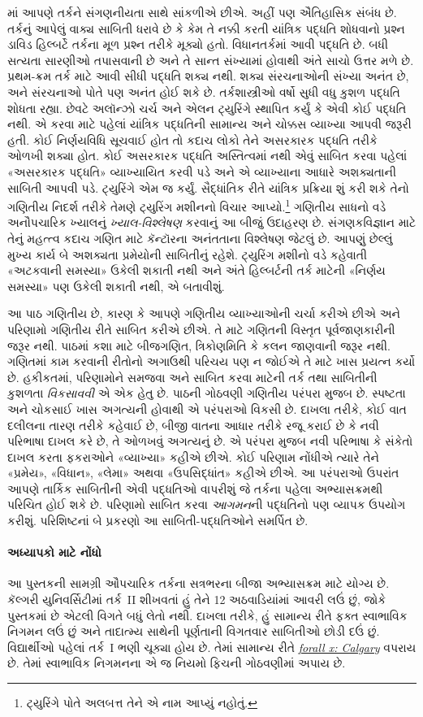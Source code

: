 માં આપણે તર્કને સંગણનીયતા સાથે સાંકળીએ છીએ. અહીં
પણ ઐતિહાસિક સંબંધ છે. તર્કનું આપેલું વાક્ય સાબિતી ધરાવે છે કે કેમ
તે નક્કી કરતી યાંત્રિક પદ્ધતિ શોધવાનો પ્રશ્ન ડાવિડ હિલ્બર્ટે તર્કના
મૂળ પ્રશ્ન તરીકે મૂક્યો હતો. વિધાનતર્કમાં આવી પદ્ધતિ છે. બધી સત્યતા
સારણીઓ તપાસવાની છે અને તે સાન્ત સંખ્યામાં હોવાથી અંતે સાચો ઉત્તર
મળે છે. પ્રથમ-ક્રમ તર્ક માટે આવી સીધી પદ્ધતિ શક્ય નથી. શક્ય
સંરચનાઓની સંખ્યા અનંત છે, અને સંરચનાઓ પોતે પણ અનંત હોઈ શકે છે.
તર્કશાસ્ત્રીઓ વર્ષો સુધી વધુ કુશળ પદ્ધતિ શોધતા રહ્યા. છેવટે અલૉન્ઝો
ચર્ચ અને એલન ટ્યુરિંગે સ્થાપિત કર્યું કે એવી કોઈ પદ્ધતિ નથી. એ કરવા
માટે પહેલાં યાંત્રિક પદ્ધતિની સામાન્ય અને ચોક્કસ વ્યાખ્યા આપવી જરૂરી
હતી. કોઈ નિર્ણયવિધિ સૂચવાઈ હોત તો કદાચ લોકો તેને અસરકારક પદ્ધતિ
તરીકે ઓળખી શક્યા હોત. કોઈ અસરકારક પદ્ધતિ અસ્તિત્વમાં નથી એવું
સાબિત કરવા પહેલાં «અસરકારક પદ્ધતિ» વ્યાખ્યાયિત કરવી પડે અને એ
વ્યાખ્યાના આધારે અશક્યતાની સાબિતી આપવી પડે. ટ્યુરિંગે એમ જ કર્યું.
સૈદ્ધાંતિક રીતે યાંત્રિક પ્રક્રિયા શું કરી શકે તેનો ગણિતીય નિદર્શ
તરીકે તેમણે ટ્યુરિંગ મશીનનો વિચાર આપ્યો.\footnote{ટ્યુરિંગે પોતે
અલબત્ત તેને એ નામ આપ્યું નહોતું.} ગણિતીય સાધનો વડે અનૌપચારિક ખ્યાલનું
\emph{ખ્યાલ-વિશ્લેષણ} કરવાનું આ બીજું ઉદાહરણ છે. સંગણકવિજ્ઞાન માટે
તેનું મહત્ત્વ કદાચ ગણિત માટે કૅન્ટૉરના અનંતતાના વિશ્લેષણ જેટલું છે.
આપણું છેલ્લું મુખ્ય કાર્ય બે અશક્યતા પ્રમેયોની સાબિતીનું રહેશે.
ટ્યુરિંગ મશીનો વડે કહેવાતી «અટકવાની સમસ્યા» ઉકેલી શકાતી નથી અને
અંતે હિલ્બર્ટની તર્ક માટેની «નિર્ણય સમસ્યા» પણ ઉકેલી શકાતી નથી, એ
બતાવીશું.

આ પાઠ ગણિતીય છે, કારણ કે આપણે ગણિતીય વ્યાખ્યાઓની ચર્ચા કરીએ છીએ અને
પરિણામો ગણિતીય રીતે સાબિત કરીએ છીએ. તે માટે ગણિતની વિસ્તૃત પૂર્વજાણકારીની
જરૂર નથી. પાઠમાં કશા માટે બીજગણિત, ત્રિકોણમિતિ કે કલન જાણવાની જરૂર
નથી. ગણિતમાં કામ કરવાની રીતોનો અગાઉથી પરિચય પણ ન જોઈએ તે માટે ખાસ
પ્રયત્ન કર્યો છે. હકીકતમાં, પરિણામોને સમજવા અને સાબિત કરવા માટેની
તર્ક તથા સાબિતીની કુશળતા \emph{વિકસાવવી} એ એક હેતુ છે. પાઠની ગોઠવણી
ગણિતીય પરંપરા મુજબ છે. સ્પષ્ટતા અને ચોકસાઈ ખાસ અગત્યની હોવાથી એ
પરંપરાઓ વિકસી છે. દાખલા તરીકે, કોઈ વાત દલીલના તારણ તરીકે કહેવાઈ
છે, બીજી વાતના આધાર તરીકે રજૂ કરાઈ છે કે નવી પરિભાષા દાખલ કરે છે,
તે ઓળખવું અગત્યનું છે. એ પરંપરા મુજબ નવી પરિભાષા કે સંકેતો દાખલ
કરતા ફકરાઓને «વ્યાખ્યા» કહીએ છીએ. કોઈ પરિણામ નોંધીએ ત્યારે તેને
«પ્રમેય», «વિધાન», «લેમા» અથવા «ઉપસિદ્ધાંત» કહીએ છીએ. આ પરંપરાઓ
ઉપરાંત આપણે તાર્કિક સાબિતીની એવી પદ્ધતિઓ વાપરીશું જે તર્કના પહેલા
અભ્યાસક્રમથી પરિચિત હોઈ શકે છે. પરિણામો સાબિત કરવા \emph{આગમન}ની
પદ્ધતિનો પણ વ્યાપક ઉપયોગ કરીશું. પરિશિષ્ટનાં બે પ્રકરણો આ
સાબિતી-પદ્ધતિઓને સમર્પિત છે.

\paragraph{અધ્યાપકો માટે નોંધો}
આ પુસ્તકની સામગ્રી ઔપચારિક તર્કના સત્રભરના બીજા અભ્યાસક્રમ માટે
યોગ્ય છે. કૅલ્ગરી યુનિવર્સિટીમાં તર્ક~II શીખવતાં હું તેને 12
અઠવાડિયાંમાં આવરી લઉં છું, જોકે પુસ્તકમાં છે એટલી વિગતે બધું લેતો નથી.
દાખલા તરીકે, હું સામાન્ય રીતે ફક્ત સ્વાભાવિક નિગમન લઉં છું અને તાદાત્મ્ય
સાથેની પૂર્ણતાની વિગતવાર સાબિતીઓ છોડી દઉં છું. વિદ્યાર્થીઓ પહેલાં
તર્ક~I ભણી ચૂક્યા હોય છે. તેમાં સામાન્ય રીતે
\emph{\href{https://forallx.openlogicproject.org}{forall x: Calgary}}
વપરાય છે. તેમાં સ્વાભાવિક નિગમનના એ જ નિયમો ફિચની ગોઠવણીમાં અપાય છે.

